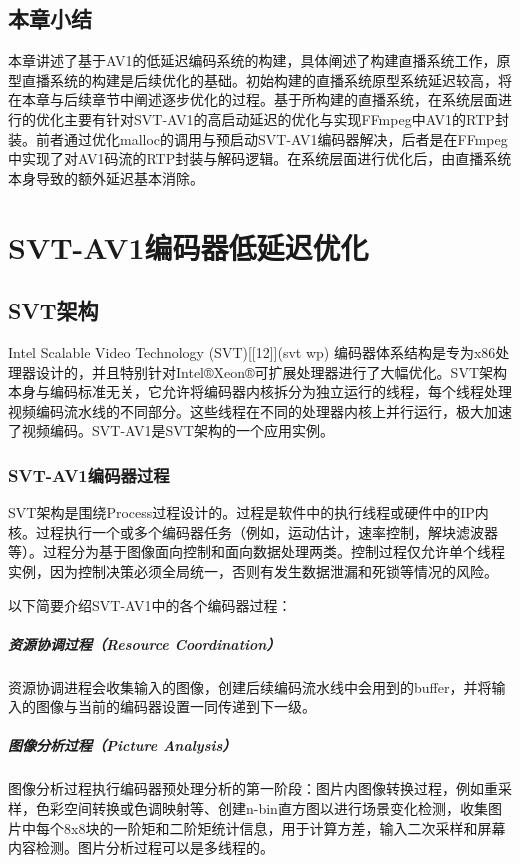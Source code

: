 \section{本章小结}
  本章讲述了基于AV1的低延迟编码系统的构建，具体阐述了构建直播系统工作，原型直播系统的构建是后续优化的基础。初始构建的直播系统原型系统延迟较高，将在本章与后续章节中阐述逐步优化的过程。基于所构建的直播系统，在系统层面进行的优化主要有针对SVT-AV1的高启动延迟的优化与实现FFmpeg中AV1的RTP封装。前者通过优化malloc的调用与预启动SVT-AV1编码器解决，后者是在FFmpeg中实现了对AV1码流的RTP封装与解码逻辑。在系统层面进行优化后，由直播系统本身导致的额外延迟基本消除。


\chapter{SVT-AV1编码器低延迟优化}

\section{SVT架构}
  Intel Scalable Video Technology (SVT)[[12]](svt wp) 编码器体系结构是专为x86处理器设计的，并且特别针对Intel®Xeon®可扩展处理器进行了大幅优化。SVT架构本身与编码标准无关，它允许将编码器内核拆分为独立运行的线程，每个线程处理视频编码流水线的不同部分。这些线程在不同的处理器内核上并行运行，极大加速了视频编码。SVT-AV1是SVT架构的一个应用实例。

\subsection{SVT-AV1编码器过程}
  SVT架构是围绕Process过程设计的。过程是软件中的执行线程或硬件中的IP内核。过程执行一个或多个编码器任务（例如，运动估计，速率控制，解块滤波器等）。过程分为基于图像面向控制和面向数据处理两类。控制过程仅允许单个线程实例，因为控制决策必须全局统一，否则有发生数据泄漏和死锁等情况的风险。

  以下简要介绍SVT-AV1中的各个编码器过程：
  \paragraph{资源协调过程（Resource Coordination）} 资源协调进程会收集输入的图像，创建后续编码流水线中会用到的buffer，并将输入的图像与当前的编码器设置一同传递到下一级。

  \paragraph{图像分析过程（Picture Analysis）} 图像分析过程执行编码器预处理分析的第一阶段：图片内图像转换过程，例如重采样，色彩空间转换或色调映射等、创建n-bin直方图以进行场景变化检测，收集图片中每个8x8块的一阶矩和二阶矩统计信息，用于计算方差，输入二次采样和屏幕内容检测。图片分析过程可以是多线程的。

